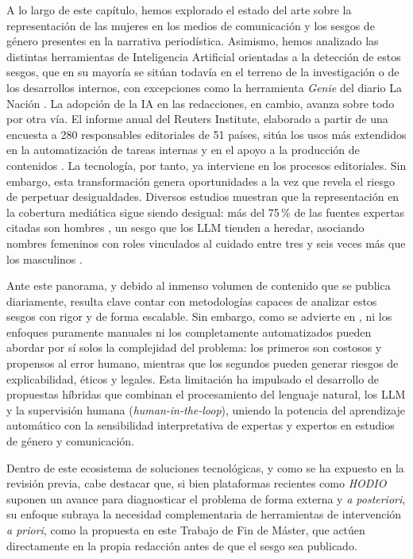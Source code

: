 
A lo largo de este capítulo, hemos explorado el estado del arte sobre la representación de las mujeres en los medios de comunicación y los sesgos de género presentes en la narrativa periodística. Asimismo, hemos analizado las distintas herramientas de Inteligencia Artificial orientadas a la detección de estos sesgos, que en su mayoría se sitúan todavía en el terreno de la investigación o de los desarrollos internos, con excepciones como la herramienta \textit{Genie} del diario La Nación \cite{lanacion2024}. La adopción de la IA en las redacciones, en cambio, avanza sobre todo por otra vía. El informe anual del Reuters Institute, elaborado a partir de una encuesta a 280 responsables editoriales de 51 países, sitúa los usos más extendidos en la automatización de tareas internas y en el apoyo a la producción de contenidos \cite{newman2026trends}. La tecnología, por tanto, ya interviene en los procesos editoriales. Sin embargo, esta transformación genera oportunidades a la vez que revela el riesgo de perpetuar desigualdades. Diversos estudios muestran que la representación en la cobertura mediática sigue siendo desigual: más del 75\,\% de las fuentes expertas citadas son hombres \cite{unwomen2025gmmp}, un sesgo que los LLM tienden a heredar, asociando nombres femeninos con roles vinculados al cuidado entre tres y seis veces más que los masculinos \cite{kotek2023}.

Ante este panorama, y debido al inmenso volumen de contenido que se publica diariamente, resulta clave contar con metodologías capaces de analizar estos sesgos con rigor y de forma escalable. Sin embargo, como se advierte en \cite{lai2021}, ni los enfoques puramente manuales ni los completamente automatizados pueden abordar por sí solos la complejidad del problema: los primeros son costosos y propensos al error humano, mientras que los segundos pueden generar riesgos de explicabilidad, éticos y legales. Esta limitación ha impulsado el desarrollo de propuestas híbridas que combinan el procesamiento del lenguaje natural, los LLM y la supervisión humana (\textit{human-in-the-loop}), uniendo la potencia del aprendizaje automático con la sensibilidad interpretativa de expertas y expertos en estudios de género y comunicación.

Dentro de este ecosistema de soluciones tecnológicas, y como se ha expuesto en la revisión previa, cabe destacar que, si bien plataformas recientes como \textit{HODIO} suponen un avance para diagnosticar el problema de forma externa y \textit{a posteriori}, su enfoque subraya la necesidad complementaria de herramientas de intervención \textit{a priori}, como la propuesta en este Trabajo de Fin de Máster, que actúen directamente en la propia redacción antes de que el sesgo sea publicado.

